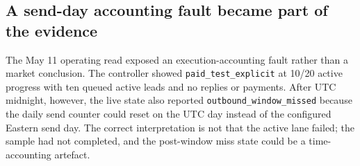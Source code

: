 \documentclass[12pt,letterpaper]{article}
\begin{document}
\subsection{A send-day accounting fault became part of the evidence}

The May 11 operating read exposed an execution-accounting fault rather than a market conclusion. The controller showed \texttt{paid\_test\_explicit} at 10/20 active progress with ten queued active leads and no replies or payments. After UTC midnight, however, the live state also reported \texttt{outbound\_window\_missed} because the daily send counter could reset on the UTC day instead of the configured Eastern send day. The correct interpretation is not that the active lane failed; the sample had not completed, and the post-window miss state could be a time-accounting artefact.
\end{document}
